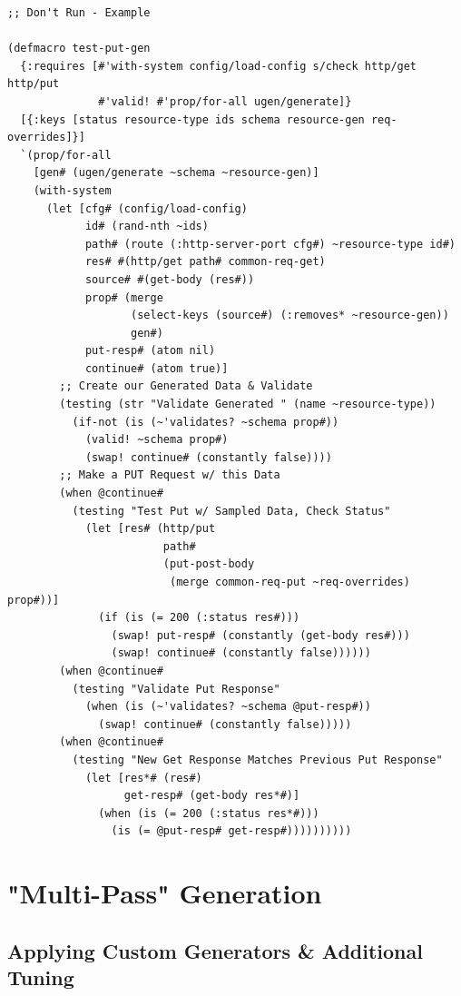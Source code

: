 \documentclass[11pt]{article}
\begin{document}
\begin{verbatim}
;; Don't Run - Example

(defmacro test-put-gen
  {:requires [#'with-system config/load-config s/check http/get http/put
              #'valid! #'prop/for-all ugen/generate]}
  [{:keys [status resource-type ids schema resource-gen req-overrides]}]
  `(prop/for-all
    [gen# (ugen/generate ~schema ~resource-gen)]
    (with-system
      (let [cfg# (config/load-config)
            id# (rand-nth ~ids)
            path# (route (:http-server-port cfg#) ~resource-type id#)
            res# #(http/get path# common-req-get)
            source# #(get-body (res#))
            prop# (merge
                   (select-keys (source#) (:removes* ~resource-gen))
                   gen#)
            put-resp# (atom nil)
            continue# (atom true)]
        ;; Create our Generated Data & Validate
        (testing (str "Validate Generated " (name ~resource-type))
          (if-not (is (~'validates? ~schema prop#))
            (valid! ~schema prop#)
            (swap! continue# (constantly false))))
        ;; Make a PUT Request w/ this Data
        (when @continue#
          (testing "Test Put w/ Sampled Data, Check Status"
            (let [res# (http/put
                        path#
                        (put-post-body
                         (merge common-req-put ~req-overrides) prop#))]
              (if (is (= 200 (:status res#)))
                (swap! put-resp# (constantly (get-body res#)))
                (swap! continue# (constantly false))))))
        (when @continue#
          (testing "Validate Put Response"
            (when (is (~'validates? ~schema @put-resp#))
              (swap! continue# (constantly false)))))
        (when @continue#
          (testing "New Get Response Matches Previous Put Response"
            (let [res*# (res#)
                  get-resp# (get-body res*#)]
              (when (is (= 200 (:status res*#)))
                (is (= @put-resp# get-resp#))))))))))
\end{verbatim}
\section{"Multi-Pass" Generation}
\label{sec-32}

\subsection{Applying Custom Generators \& Additional Tuning}
\label{sec-32-1}
\end{document}
